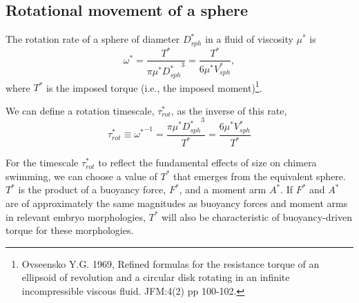 \documentclass[10pt,a4paper]{article}
\begin{document}
\subsection{Rotational movement of a sphere}\label{RotSect}
The rotation rate of a sphere of diameter $D_{sph}^*$ in a fluid of viscosity $\mu^*$ is 
\begin{equation}\label{rot1}
	\omega^* = \frac{T^*}{\pi \mu^* {D_{sph}^*}^3} = \frac{T^*}{6 \mu^* V_{sph}^*},	
\end{equation}
where $T^*$ is the imposed torque (i.e., the imposed moment)\footnote{Ovseensko Y.G. 1969, Refined formulas for the resistance torque of an ellipsoid of revolution and a circular disk rotating in an infinite incompressible viscous fluid. JFM:4(2) pp 100-102.}.

We can define a rotation timescale, $\tau^*_{rot}$, as the inverse of this rate,
\begin{equation}\label{tau1}
	\tau^*_{rot} \equiv {\omega^*}^{-1} = \frac{\pi \mu^* {D_{sph}^*}^3}{T^*} = \frac{6 \mu^* V_{sph}^*}{T^*}
\end{equation}

For the timescale $\tau^*_{rot}$ to reflect the fundamental effects of size on chimera swimming, we can choose a value of $T^*$ that emerges from the equivalent sphere.
$T^*$ is the product of a buoyancy force, $F^*$, and a moment arm $A^*$.
If $F^*$ and $A^*$ are of approximately the same magnitudes as buoyancy forces and moment arms in relevant embryo morphologies, $T^*$ will also be characteristic of buoyancy-driven torque for these morphologies.
\end{document}
